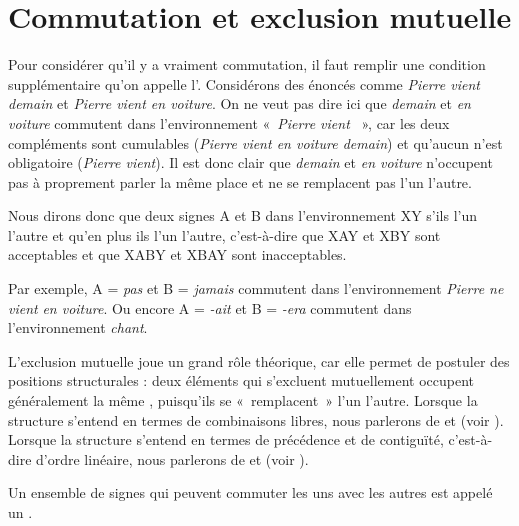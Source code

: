 \section{Commutation et exclusion mutuelle}\label{sec:2.2.1}

Pour considérer qu’il y a vraiment commutation, il faut remplir une condition supplémentaire qu’on appelle l’. Considérons des énoncés comme \textit{Pierre vient demain} et \textit{Pierre vient en voiture}. On ne veut pas dire ici que \textit{demain} et \textit{en voiture} commutent dans l’environnement «~\textit{Pierre vient {\longrule}}~», car les deux compléments sont cumulables (\textit{Pierre vient en voiture demain}) et qu’aucun n’est obligatoire (\textit{Pierre vient}). Il est donc clair que \textit{demain} et \textit{en voiture} n’occupent pas à proprement parler la même place et ne se remplacent pas l’un l’autre.

{Nous dirons donc que deux signes A et B  dans l’environnement X{\longrule}Y s’ils  l’un l’autre et qu’en plus ils  l’un l’autre, c’est-à-dire que XAY et XBY sont acceptables et que XABY et XBAY sont inacceptables.}

Par exemple, A = \textit{pas} et B = \textit{jamais} commutent dans l’environnement \textit{Pierre ne vient {\longrule}} \textit{en voiture}. Ou encore A = \textit{{}-ait} et B = \textit{{}-era} commutent dans l’environnement \textit{chant{\longrule}}.

L’exclusion mutuelle joue un grand rôle théorique, car elle permet de postuler des positions structurales : deux éléments qui s’excluent mutuellement occupent généralement la même , puisqu’ils se «~remplacent~» l’un l’autre. Lorsque la structure s’entend en termes de combinaisons libres, nous parlerons de  et  (voir ). Lorsque la structure s’entend en termes de précédence et de contiguïté, c’est-à-dire d’ordre linéaire, nous parlerons de  et  (voir ).

{Un ensemble de signes qui peuvent commuter les uns avec les autres est appelé un .}

